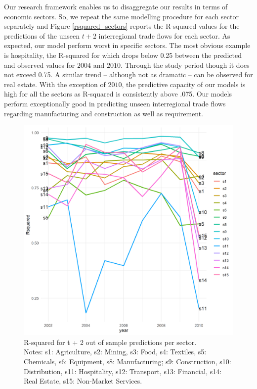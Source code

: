 \documentclass[sigconf]{acmart}
\begin{document}
Our research framework enables us to disaggregate our results in terms
of economic sectors. So, we repeat the same modelling procedure for each
sector separately and Figure \ref{rsquared_sectors} reports the
R-squared values for the predictions of the unseen \(t + 2\)
interregional trade flows for each sector. As expected, our model
perform worst in specific sectors. The most obvious example is
hospitality, the R-squared for which drops below 0.25 between the
predicted and observed values for \(2004\) and \(2010\). Through the
study period though it does not exceed 0.75. A similar trend -- although
not as dramatic -- can be observed for real estate. With the exception
of \(2010\), the predictive capacity of our models is high for all the
sectors as R-squared is consistently above .075. Our models perform
exceptionally good in predicting unseen interregional trade flows
regarding manufacturing and construction as well as requirement.

\begin{figure}[p]
	\includegraphics[width=1\linewidth]{figures/sector_rsquared} \caption{\label{rsquared_sectors}R-squared for t + 2 out of sample predictions per sector.\\\hspace{\textwidth}\tiny Notes: s1: Agriculture, s2: Mining, s3: Food, s4: Textiles, s5: Chemicals, s6: Equipment, s8: Manufacturing; s9: Construction, s10: Distribution, s11: Hospitality, s12:  Transport, s13: Financial, s14: Real Estate, s15: Non-Market Services.}\label{fig:unnamed-chunk-7}
\end{figure}
\end{document}
